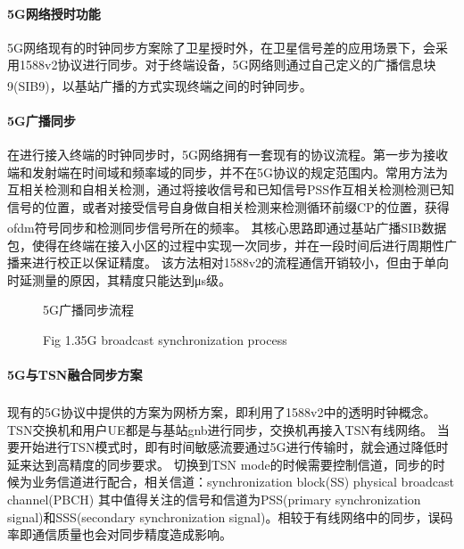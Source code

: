 \documentclass[UTF8,a4paper,12pt]{ctexart}
\numberwithin{equation}{section}
\begin{document}
	\paragraph{5G网络授时功能}
	5G网络现有的时钟同步方案除了卫星授时外，在卫星信号差的应用场景下，会采用1588v2协议进行同步。对于终端设备，5G网络则通过自己定义的广播信息块9(SIB9)，以基站广播的方式实现终端之间的时钟同步\textsuperscript{\cite{schungel2021optimized}}。
	
	\paragraph{5G广播同步}
	
	
	在进行接入终端的时钟同步时，5G网络拥有一套现有的协议流程。第一步为接收端和发射端在时间域和频率域的同步，并不在5G协议的规定范围内。常用方法为互相关检测和自相关检测，通过将接收信号和已知信号PSS作互相关检测检测已知信号的位置，或者对接受信号自身做自相关检测来检测循环前缀CP的位置，获得ofdm符号同步和检测同步信号所在的频率\textsuperscript{\cite{goodarzi2020synchronization}}。
	其核心思路即通过基站广播SIB数据包，使得在终端在接入小区的过程中实现一次同步，并在一段时间后进行周期性广播来进行校正以保证精度。
	该方法相对1588v2的流程通信开销较小，但由于单向时延测量的原因，其精度只能达到μs级。
	\begin{figure}[htb] 
		\caption{5G广播同步流程}
		\vspace{-10pt}
		\caption*{Fig 1.3\quad 5G broadcast synchronization process}
	\end{figure}
	\paragraph{5G与TSN融合同步方案}
	现有的5G协议中提供的方案为网桥方案\textsuperscript{\cite{nikhileswar2022traffic}}，即利用了1588v2中的透明时钟概念。TSN交换机和用户UE都是与基站gnb进行同步，交换机再接入TSN有线网络。
	当要开始进行TSN模式时，即有时间敏感流要通过5G进行传输时，就会通过降低时延来达到高精度的同步要求。
	切换到TSN mode的时候需要控制信道，同步的时候为业务信道进行配合，相关信道：synchronization block(SS)   physical broadcast channel(PBCH)
	其中值得关注的信号和信道为PSS(primary synchronization signal)和SSS(secondary synchronization signal)。相较于有线网络中的同步，误码率即通信质量也会对同步精度造成影响。
\end{document}
